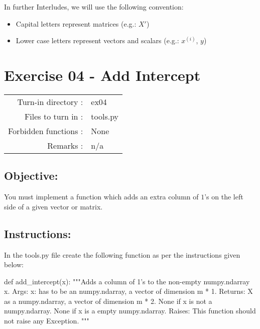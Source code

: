 \documentclass[]{article}
\newenvironment{Shaded}{\begin{snugshade}}{\end{snugshade}}
\newcommand{\CommentTok}[1]{\textcolor[rgb]{0.48,0.49,0.49}{#1}}
\newcommand{\KeywordTok}[1]{\textcolor[rgb]{0.81,0.81,0.76}{#1}}
\newcommand{\NormalTok}[1]{\textcolor[rgb]{0.81,0.81,0.76}{#1}}
\begin{document}
In further Interludes, we will use the following convention:

\begin{itemize}
\item
  Capital letters represent matrices (e.g.: \(X'\))
\item
  Lower case letters represent vectors and scalars (e.g.: \(x^{(i)}\),
  \(y\)) \clearpage
\end{itemize}

\hypertarget{exercise-04---add-intercept-1}{%
\section{Exercise 04 - Add
Intercept}\label{exercise-04---add-intercept-1}}

\begin{longtable}[]{@{}rl@{}}
\toprule
\endhead
Turn-in directory : & ex04\tabularnewline
Files to turn in : & tools.py\tabularnewline
Forbidden functions : & None\tabularnewline
Remarks : & n/a\tabularnewline
\bottomrule
\end{longtable}

\hypertarget{objective-1}{%
\subsection{Objective:}\label{objective-1}}

You must implement a function which adds an extra column of \(1\)'s on
the left side of a given vector or matrix.

\hypertarget{instructions-1}{%
\subsection{Instructions:}\label{instructions-1}}

In the tools.py file create the following function as per the
instructions given below:

\begin{Shaded}
\begin{Highlighting}[]
\KeywordTok{def}\NormalTok{ add_intercept(x):}
    \CommentTok{"""Adds a column of 1's to the non-empty numpy.ndarray x.}
\CommentTok{    Args:}
\CommentTok{      x: has to be an numpy.ndarray, a vector of dimension m * 1.}
\CommentTok{    Returns:}
\CommentTok{      X as a numpy.ndarray, a vector of dimension m * 2.}
\CommentTok{      None if x is not a numpy.ndarray.}
\CommentTok{      None if x is a empty numpy.ndarray.}
\CommentTok{    Raises:}
\CommentTok{      This function should not raise any Exception.}
\CommentTok{    """}
\end{Highlighting}
\end{Shaded}
\end{document}
